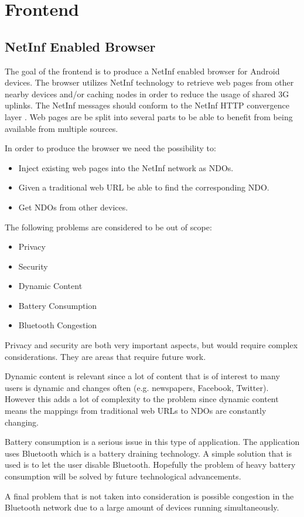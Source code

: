 \section{Frontend}

\subsection{NetInf Enabled Browser}

The goal of the frontend is to produce a NetInf enabled browser for Android devices. The browser utilizes NetInf technology to retrieve web pages from other nearby devices and/or caching nodes in order to reduce the usage of shared 3G uplinks. The NetInf messages should conform to the NetInf HTTP convergence layer \cite{netinfproto}. Web pages are be split into several parts to be able to benefit from being available from multiple sources.

In order to produce the browser we need the possibility to:

\begin{itemize}
	\item Inject existing web pages into the NetInf network as NDOs.
	\item Given a traditional web URL be able to find the corresponding NDO.
	\item Get NDOs from other devices.
\end{itemize}

The following problems are considered to be out of scope:

\begin{itemize}
	\item Privacy
	\item Security
	\item Dynamic Content
	\item Battery Consumption
	\item Bluetooth Congestion
\end{itemize}

Privacy and security are both very important aspects, but would require complex considerations. They are areas that require future work.

Dynamic content is relevant since a lot of content that is of interest to many users is dynamic and changes often (e.g. newspapers, Facebook, Twitter). However this adds a lot of complexity to the problem since dynamic content means the mappings from traditional web URLs to NDOs are constantly changing.

Battery consumption is a serious issue in this type of application. The application uses Bluetooth which is a battery draining technology. A simple solution that is used is to let the user disable Bluetooth. Hopefully the problem of heavy battery consumption will be solved by future technological advancements.

A final problem that is not taken into consideration is possible congestion in the Bluetooth network due to a large amount of devices running simultaneously.